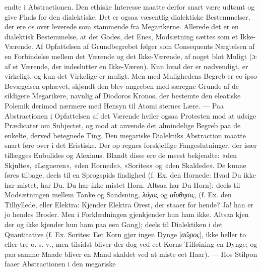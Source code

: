 \documentclass[12pt,a4paper]{book}
\newcommand{\gk}[1]{\textit{#1}}
\begin{document}
endte i Abstractionen. Den ethiske Interesse maatte derfor
snart være udtømt og give Plads for den dialektiske. Det er
ogsaa væsentlig dialektiske Bestemmelser, der ere os over\-%
leverede som stammende fra Megarikerne. Allerede det er en
dialektisk Bestemmelse, at det Godes, det Enes, Modsætning
sættes som et Ikke-Værende. Af Opfattelsen af Grundbegrebet
følger som Consequents Nægtelsen af en Forbindelse mellem
det Værende og det Ikke-Værende, af noget blot Muligt (ɔ: af
et Værende, der indeslutter en Ikke-Væren). Kun hvad der
er nødvendigt, er virkeligt, og kun det Virkelige er muligt.
Men med Mulighedens Begreb er eo ipso Bevægelsen ophævet,
skjøndt den blev angreben med særegne Grunde af de sildigere
Megarikere, navnlig af Diodoros Kronos, der bestemte den
eleatiske Polemik derimod nærmere med Hensyn til Atomi\-%
sternes Lære. --- Paa Abstractionen i Opfattelsen af det
Værende hviler ogsaa Protesten mod at udsige Prædicater om
Subjectet, og mod at anvende det almindelige Begreb paa de
enkelte, derved betegnede Ting. Den megariske Dialektiks
Abstraction maatte snart føre over i det Eristiske. Der op\-%
regnes forskjellige Fangeslutninger, der især tillægges Eubulides
og Alexinus. Blandt disse ere de meest bekjendte: «den
Skjulte», «Løgneren», «den Hornede», «Sorites» og «den
Skaldede». De kunne føres tilbage, deels til en Sprogspids\-%
findighed (f. Ex. den Hornede: Hvad Du ikke har mistet, har
Du. Du har ikke mistet Horn. Altsaa har Du Horn); deels
til Modsætningen mellem Tanke og Sandsning, \gk{λόγος} og
\gk{αἴσθησις}, (f. Ex. den Tilhyllede, eller Elektra: Kjender Elektra
Orest, der staaer for hende? Ja! han er jo hendes Broder.
Men i Forklædningen gjenkjender hun ham ikke. Altsaa kjen\-%
der og ikke kjender hun ham paa een Gang); deels til
Dialektiken i det Quantitative (f. Ex. Sorites: Eet Korn gjør
ingen Dynge [\gk{σῶρος}], ikke heller to eller tre o. s. v., men
tilsidst bliver der dog ved eet Korns Tilføining en Dynge; og
paa samme Maade bliver en Mand skaldet ved at miste eet
Haar). --- Hos Stilpon faaer Abstractionen i den megariske
\end{document}
